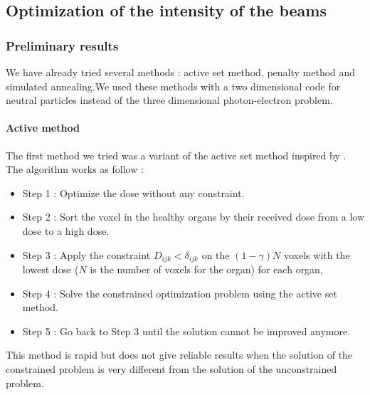 \subsection{Optimization of the intensity of the beams}
\subsubsection{Preliminary results}
We have already tried several methods : active set method, penalty method
and simulated annealing.We used these methods with a  two dimensional code for 
neutral particles instead of the three dimensional photon-electron problem. 

\paragraph{Active method}
The first method we tried was a variant of the active set method inspired by
\cite{dose-volume}. The algorithm works as follow :
\begin{itemize}
\item Step 1 : Optimize the dose without any constraint.
\item Step 2 : Sort the voxel in the healthy organs by their received dose
from a low dose to a high dose.
\item Step 3 : Apply the constraint $D_{ijk}<\delta_{ijk}$ on the $(1-\gamma)
N$ voxels with the lowest dose ($N$ is the number of voxels for the organ) for
each organ,
\item Step 4 : Solve the constrained optimization problem using the active set
method.
\item Step 5 : Go back to Step 3 until the solution cannot be improved
anymore. 
\end{itemize}
This method is rapid but does not give reliable results when the solution of the
constrained problem is very different from the solution of the unconstrained
problem. 

